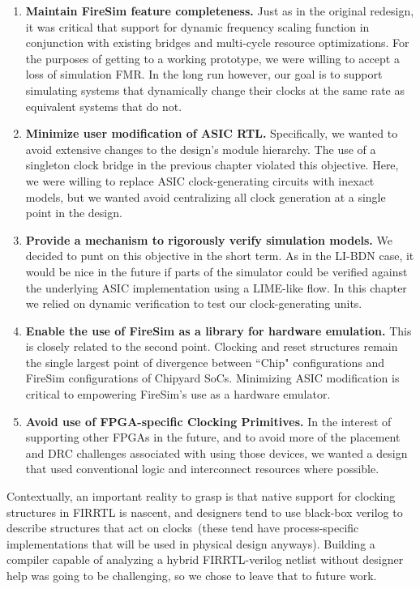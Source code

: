 \begin{enumerate}
\item \textbf{Maintain FireSim feature completeness.} Just as in the original
redesign, it was critical that support for dynamic frequency scaling function in
conjunction with existing bridges and multi-cycle resource optimizations. For
the purposes of getting to a working prototype, we were willing to accept a loss of
simulation FMR. In the long run however, our goal is to support simulating
systems that dynamically change their clocks at the same rate as equivalent
systems that do not.

\item \textbf{Minimize user modification of ASIC RTL.}
Specifically, we wanted to avoid extensive changes to the design's module
    hierarchy. The use of a singleton clock bridge in the previous chapter
    violated this objective. Here, we were willing to replace ASIC
    clock-generating circuits with inexact models, but we wanted avoid
    centralizing all clock generation at a single point in the design.

\item \textbf{Provide a mechanism to rigorously verify simulation models.} We
decided to punt on this objective in the short term. As in the LI-BDN case, it would be
nice in the future if parts of the simulator could be verified against the
underlying ASIC implementation using a LIME-like flow. In this chapter
we relied on dynamic verification to test our clock-generating units.

\item \textbf{Enable the use of FireSim as a library for hardware emulation.}
This is closely related to the second point. Clocking and reset structures
remain the single largest point of divergence between ``Chip" configurations and
FireSim configurations of Chipyard SoCs. Minimizing ASIC modification is critical to empowering FireSim's
use as a hardware emulator.

\item \textbf{Avoid use of FPGA-specific Clocking Primitives.}
In the interest of supporting other FPGAs in the future, and to avoid more of
the placement and DRC challenges associated with using those devices,
we wanted a design that used conventional logic and interconnect
resources where possible.
\end{enumerate}

Contextually, an important reality to grasp is that native support for clocking
structures in FIRRTL is nascent, and designers tend to use black-box verilog to
describe structures that act on clocks~(these tend have process-specific
implementations that will be used in physical design anyways). Building a compiler
capable of analyzing a hybrid FIRRTL-verilog netlist without designer help was
going to be challenging, so we chose to leave that to future work.

